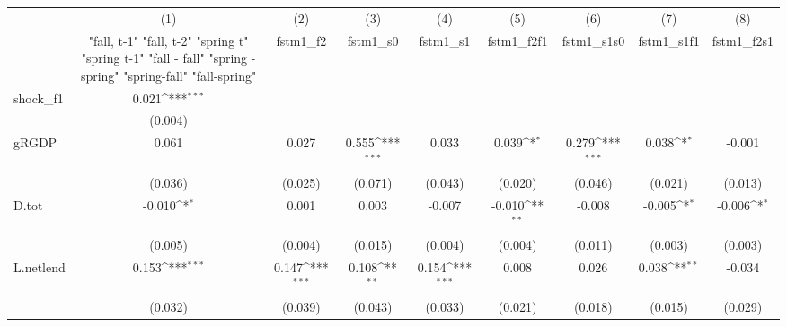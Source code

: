 {
\def\sym#1{\ifmmode^{#1}\else\(^{#1}\)\fi}
\begin{tabular}{l*{8}{c}}
\toprule
            &\multicolumn{1}{c}{(1)}&\multicolumn{1}{c}{(2)}&\multicolumn{1}{c}{(3)}&\multicolumn{1}{c}{(4)}&\multicolumn{1}{c}{(5)}&\multicolumn{1}{c}{(6)}&\multicolumn{1}{c}{(7)}&\multicolumn{1}{c}{(8)}\\
            &\multicolumn{1}{c}{  "fall, t-1" "fall, t-2" "spring t" "spring t-1"  "fall - fall" "spring - spring" "spring-fall" "fall-spring" }&\multicolumn{1}{c}{fstm1\_f2}&\multicolumn{1}{c}{fstm1\_s0}&\multicolumn{1}{c}{fstm1\_s1}&\multicolumn{1}{c}{fstm1\_f2f1}&\multicolumn{1}{c}{fstm1\_s1s0}&\multicolumn{1}{c}{fstm1\_s1f1}&\multicolumn{1}{c}{fstm1\_f2s1}\\
\midrule
shock\_f1    &       0.021\sym{***}&                     &                     &                     &                     &                     &                     &                     \\
            &     (0.004)         &                     &                     &                     &                     &                     &                     &                     \\
\addlinespace
gRGDP       &       0.061         &       0.027         &       0.555\sym{***}&       0.033         &       0.039\sym{*}  &       0.279\sym{***}&       0.038\sym{*}  &      -0.001         \\
            &     (0.036)         &     (0.025)         &     (0.071)         &     (0.043)         &     (0.020)         &     (0.046)         &     (0.021)         &     (0.013)         \\
\addlinespace
D.tot       &      -0.010\sym{*}  &       0.001         &       0.003         &      -0.007         &      -0.010\sym{**} &      -0.008         &      -0.005\sym{*}  &      -0.006\sym{*}  \\
            &     (0.005)         &     (0.004)         &     (0.015)         &     (0.004)         &     (0.004)         &     (0.011)         &     (0.003)         &     (0.003)         \\
\addlinespace
L.netlend   &       0.153\sym{***}&       0.147\sym{***}&       0.108\sym{**} &       0.154\sym{***}&       0.008         &       0.026         &       0.038\sym{**} &      -0.034         \\
            &     (0.032)         &     (0.039)         &     (0.043)         &     (0.033)         &     (0.021)         &     (0.018)         &     (0.015)         &     (0.029)         \\

\end{tabular}}
